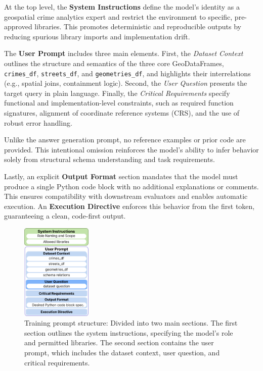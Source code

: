 At the top level, the \textbf{System Instructions} define the model’s identity as a geospatial crime analytics expert and restrict the environment to specific, pre-approved libraries. This promotes deterministic and reproducible outputs by reducing spurious library imports and implementation drift.

The \textbf{User Prompt} includes three main elements. First, the \textit{Dataset Context} outlines the structure and semantics of the three core GeoDataFrames, \texttt{crimes\_df}, \texttt{streets\_df}, and \texttt{geometries\_df}, and highlights their interrelations (e.g., spatial joins, containment logic). Second, the \textit{User Question} presents the target query in plain language. Finally, the \textit{Critical Requirements} specify functional and implementation-level constraints, such as required function signatures, alignment of coordinate reference systems (CRS), and the use of robust error handling.

Unlike the answer generation prompt, no reference examples or prior code are provided. This intentional omission reinforces the model's ability to infer behavior solely from structural schema understanding and task requirements.

Lastly, an explicit \textbf{Output Format} section mandates that the model must produce a single Python code block with no additional explanations or comments. This ensures compatibility with downstream evaluators and enables automatic execution. An \textbf{Execution Directive} enforces this behavior from the first token, guaranteeing a clean, code-first output.

\begin{figure}[H]
  \centering
  \includegraphics[width=0.3\textwidth]{images/prompt.png}
  \captionsetup{justification=raggedright,singlelinecheck=false}
  \caption{Training prompt structure: Divided into two main sections. The first section outlines the system instructions, specifying the model's role and permitted libraries. The second section contains the user prompt, which includes the dataset context, user question, and critical requirements.}
  \label{fig:training_prompt_structure}
\end{figure}


